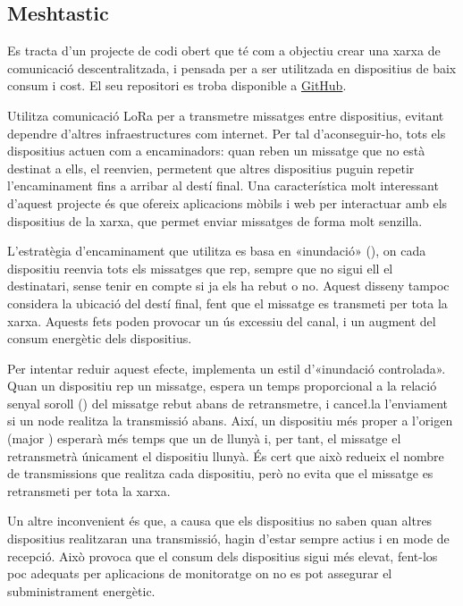 \documentclass{tfgitic}[2024/07/01]
\begin{document}
\subsection{Meshtastic}
Es tracta d'un projecte de codi obert que té com a objectiu crear una xarxa de comunicació descentralitzada, i pensada per a ser utilitzada en dispositius de baix consum i cost. El seu repositori es troba disponible a \href{https://github.com/meshtastic}{GitHub}.

Utilitza comunicació LoRa per a transmetre missatges entre dispositius, evitant dependre d'altres infraestructures com internet. Per tal d'aconseguir-ho, tots els dispositius actuen com a encaminadors: quan reben un missatge que no està destinat a ells, el reenvien, permetent que altres dispositius puguin repetir l'encaminament fins a arribar al destí final. Una característica molt interessant d'aquest projecte és que ofereix aplicacions mòbils i web per interactuar amb els dispositius de la xarxa, que permet enviar missatges de forma molt senzilla.

L'estratègia d'encaminament que utilitza es basa en «inundació» (), on cada dispositiu reenvia tots els missatges que rep, sempre que no sigui ell el destinatari, sense tenir en compte si ja els ha rebut o no. Aquest disseny tampoc considera la ubicació del destí final, fent que el missatge es transmeti per tota la xarxa. Aquests fets poden provocar un ús excessiu del canal, i un augment del consum energètic dels dispositius. 

Per intentar reduir aquest efecte, implementa un estil d'«inundació controlada». Quan un dispositiu rep un missatge, espera un temps proporcional a la relació senyal soroll () del missatge rebut abans de retransmetre, i cance\l.la l'enviament si un node realitza la transmissió abans. Així, un dispositiu més proper a l'origen (major ) esperarà més temps que un de llunyà i, per tant, el missatge el retransmetrà únicament el dispositiu llunyà. És cert que això redueix el nombre de transmissions que realitza cada dispositiu, però no evita que el missatge es retransmeti per tota la xarxa. 

Un altre inconvenient és que, a causa que els dispositius no saben quan altres dispositius realitzaran una transmissió, hagin d'estar sempre actius i en mode de recepció. Això provoca que el consum dels dispositius sigui més elevat, fent-los poc adequats per aplicacions de monitoratge on no es pot assegurar el subministrament energètic.
\end{document}
